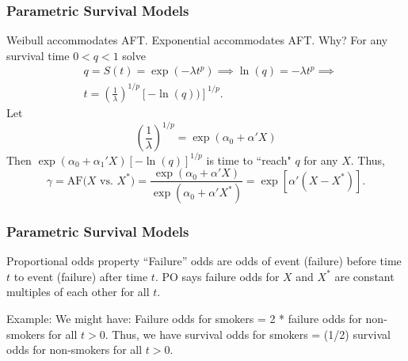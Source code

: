 \documentclass{beamer}
\theoremstyle{definition}
\begin{document}
\begin{frame}
\frametitle{Parametric Survival Models}
\begin{block}{Weibull accommodates AFT.}
Exponential accommodates AFT. Why? For any survival time $0 < q < 1$ solve
\begin{align*}
& q = S(t) =  \exp(-\lambda t^p) \implies \ln(q) = - \lambda t^p \implies \\
& t = \left(\frac{1}{\lambda}\right)^{1/p} [- \ln(q))]^{1/p}.
\end{align*}
Let
\[
\left(\frac{1}{\lambda}\right)^{1/p} = \exp(\alpha_0 + \alpha'X)
\]
Then $\exp(\alpha_0 + \alpha_1'X)[- \ln(q)]^{1/p}$ is time to ``reach" $q$ for any $X$. Thus,
\vspace{-10pt}
\[
\gamma = \text{AF($X$ vs. $X^*$)} = \frac{\exp(\alpha_0 + \alpha'X)}{\exp(\alpha_0 + \alpha'X^*)} = \exp[\alpha'(X-X^*)].
\]
\end{block}
\end{frame}



 


\begin{frame}
\frametitle{Parametric Survival Models}
\begin{block}{Proportional odds property}
``Failure'' odds are odds of event (failure) before time $t$ to event (failure) after time $t$. PO says failure odds for $X$ and $X^*$ are constant multiples of each other for all $t$.
\vspace{10pt}

Example: We might have: Failure odds for smokers = 2 * failure odds for non-smokers for all $t>0$. Thus, we have survival odds for smokers = (1/2) survival odds for non-smokers for all $t>0$.
\end{block}
\end{frame}
\end{document}
